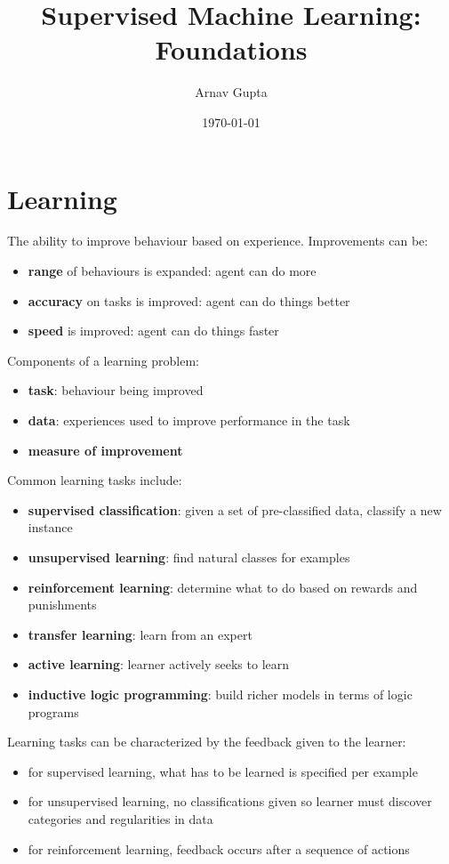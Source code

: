 \documentclass[11pt]{article}
\author{Arnav Gupta}
\date{\today}
\title{Supervised Machine Learning: Foundations}
\begin{document}
\maketitle
\tableofcontents

\section{Learning}
\label{sec:org24e290b}
The ability to improve behaviour based on experience.
Improvements can be:
\begin{itemize}
\item \textbf{range} of behaviours is expanded: agent can do more
\item \textbf{accuracy} on tasks is improved: agent can do things better
\item \textbf{speed} is improved: agent can do things faster
\end{itemize}

Components of a learning problem:
\begin{itemize}
\item \textbf{task}: behaviour being improved
\item \textbf{data}: experiences used to improve performance in the task
\item \textbf{measure of improvement}
\end{itemize}

Common learning tasks include:
\begin{itemize}
\item \textbf{supervised classification}: given a set of pre-classified data, classify a new instance
\item \textbf{unsupervised learning}: find natural classes for examples
\item \textbf{reinforcement learning}: determine what to do based on rewards and punishments
\item \textbf{transfer learning}: learn from an expert
\item \textbf{active learning}: learner actively seeks to learn
\item \textbf{inductive logic programming}: build richer models in terms of logic programs
\end{itemize}

Learning tasks can be characterized by the feedback given to the learner:
\begin{itemize}
\item for supervised learning, what has to be learned is specified per example
\item for unsupervised learning, no classifications given so learner must discover categories and regularities
in data
\item for reinforcement learning, feedback occurs after a sequence of actions
\end{itemize}
\end{document}
